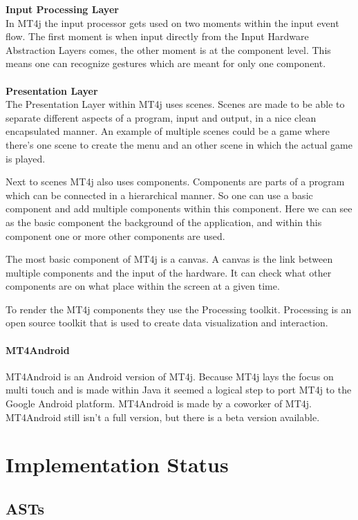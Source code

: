 \documentclass[a4paper,12pt]{report}
\begin{document}
\textbf{Input Processing Layer}
\\
In MT4j the input processor gets used on two moments within the input event flow. The first moment is when input directly from the Input Hardware Abstraction Layers comes, the other moment
is at the component level. This means one can recognize gestures which are meant for only one component.
\\
\\
\textbf{Presentation Layer}
\\
The Presentation Layer within MT4j uses scenes. Scenes are made to be able to separate different aspects of a program, input and output, in a nice clean encapsulated 
manner. An example of multiple scenes could be a game where there's one scene to create the menu and an other scene in which the actual game is played.

Next to scenes MT4j also uses components. Components are parts of a program which can be connected in a hierarchical manner. So one can use a basic component and add multiple
components within this component. Here we can see as the basic component the background of the application, and within this component one or more other components are used.

The most basic component of MT4j is a canvas. A canvas is the link between multiple components and the input of the hardware. It can check what other components are on
what place within the screen at a given time.

To render the MT4j components they use the Processing toolkit. Processing is an open source toolkit that is used to create data visualization and interaction.

\subsubsection{MT4Android}
MT4Android is an Android version of MT4j. Because MT4j lays the focus on multi touch and is made within Java it seemed a logical step to port MT4j to the Google Android 
platform. MT4Android is made by a coworker of MT4j. MT4Android still isn't a full version, but there is a beta version available.


\chapter{Implementation Status}
\section{ASTs}
\end{document}
